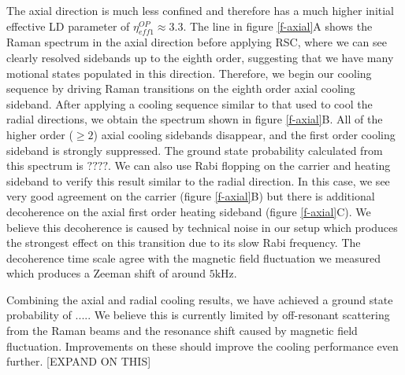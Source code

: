 \documentclass[aps,prl,twocolumn,groupedaddress]{revtex4-1}
\begin{document}
The axial direction is much less confined and therefore has a much higher initial effective
LD parameter of $\eta^{OP}_{eff1}\approx3.3$.
The line in figure \ref{f-axial}A shows the Raman spectrum in the axial direction
before applying RSC, where we can see clearly resolved sidebands
up to the eighth order, suggesting that we have many motional states populated in this direction.
Therefore, we begin our cooling sequence by driving Raman transitions on the eighth order axial
cooling sideband. After applying a cooling sequence similar to that used to cool
the radial directions, we obtain the spectrum shown in figure \ref{f-axial}B.
All of the higher order ($\geqslant2$) axial cooling sidebands disappear, and the first order
cooling sideband is strongly suppressed.
The ground state probability calculated from this spectrum is $????$.
We can also use Rabi flopping on the carrier and heating sideband to verify this result
similar to the radial direction. In this case, we see very good agreement on the carrier
(figure \ref{f-axial}B) but there is additional decoherence on the axial first order
heating sideband (figure \ref{f-axial}C).
We believe this decoherence is caused by technical noise in our setup which
produces the strongest effect on this transition due to its slow Rabi frequency.
The decoherence time scale agree with the magnetic field fluctuation we measured which produces
a Zeeman shift of around $5\text{kHz}$.

Combining the axial and radial cooling results, we have achieved a ground state probability of
$....$. We believe this is currently limited by off-resonant scattering from the Raman beams
and the resonance shift caused by magnetic field fluctuation.
Improvements on these should improve the cooling performance even further.  [EXPAND ON THIS]



\end{document}
